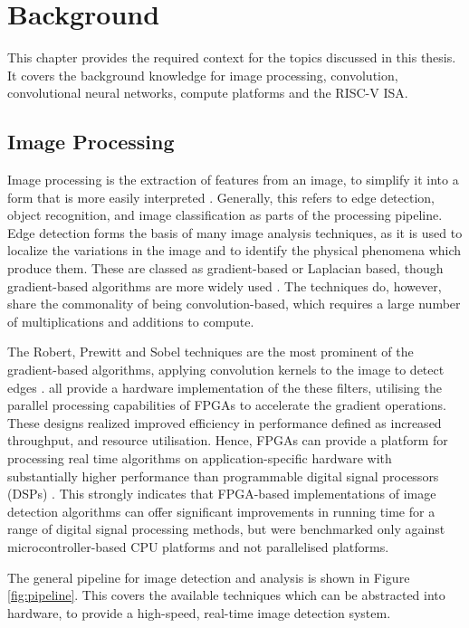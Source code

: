 \chapter[Background]{Background}
\label{Chap:Background}

This chapter provides the required context for the topics discussed in this thesis. It covers the background knowledge for image processing, convolution, convolutional neural networks, compute platforms and the RISC-V ISA.

\section{Image Processing}
Image processing is the extraction of features from an image, to simplify it into a form that is more easily interpreted \cite{Mathworks}.
Generally, this refers to edge detection, object recognition, and image classification as parts of the processing pipeline.
Edge detection forms the basis of many image analysis techniques, as it is used to localize the variations in the image and to identify the physical phenomena which produce them.
These are classed as gradient-based or Laplacian based, though gradient-based algorithms are more widely used \cite{Gradient}.
The techniques do, however, share the commonality of being convolution-based, which requires a large number of multiplications and additions to compute.

The Robert, Prewitt and Sobel techniques are the most prominent of the gradient-based algorithms, applying convolution kernels to the image to detect edges \cite{Segmentation}.
\cite{XSG, Sobel, Canny, Aerial, Video} all provide a hardware implementation of the these filters, utilising the parallel processing capabilities of FPGAs to accelerate the gradient operations.
These designs realized improved efficiency in performance defined as increased throughput, and resource utilisation. 
Hence, FPGAs can provide a platform for processing real time algorithms on application-specific hardware with substantially higher performance than programmable digital signal processors (DSPs) \cite{RTEdge}.
This strongly indicates that FPGA-based implementations of image detection algorithms can offer significant improvements in running time for a range of digital signal processing methods, but were benchmarked only against microcontroller-based CPU platforms and not parallelised platforms.

The general pipeline for image detection and analysis is shown in Figure \ref{fig:pipeline}. 
This covers the available techniques which can be abstracted into hardware, to provide a high-speed, real-time image detection system.

